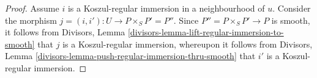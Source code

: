 \documentclass[10pt,a4paper]{amsart}
\theoremstyle{plain}
\theoremstyle{definition}
\theoremstyle{remark}
\numberwithin{equation}{subsection}
\begin{document}
\begin{proof}
Assume $i$ is a Koszul-regular immersion in a neighbourhood of $u$.
Consider the morphism $j = (i, i') : U \to P \times_S P' = P''$.
Since $P'' = P \times_S P' \to P$ is smooth, it follows from
Divisors, Lemma \ref{divisors-lemma-lift-regular-immersion-to-smooth}
that $j$ is a Koszul-regular immersion, whereupon it follows from
Divisors, Lemma \ref{divisors-lemma-push-regular-immersion-thru-smooth}
that $i'$ is a Koszul-regular immersion.
\end{proof}
\end{document}
